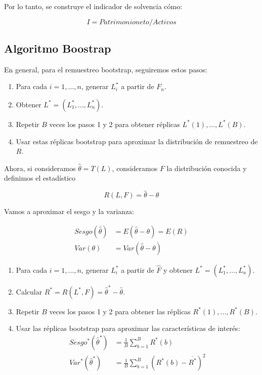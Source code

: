\documentclass[
]{article}
\begin{document}
Por lo tanto, se construye el indicador de solvencia cómo:

\[I=Patrimonio neto/Activos\]

\hypertarget{algoritmo-boostrap}{%
\subsection{Algoritmo Boostrap}\label{algoritmo-boostrap}}

En general, para el remuestreo bootstrap, seguiremos estos pasos:

\begin{enumerate}
    \item Para cada $i=1, \ldots, n$, generar $L^*_i$ a partir de $F_n$.
    \item Obtener $L^* = (L^*_1, \ldots, L^*_n)$.
    \item Repetir $B$ veces los pasos 1 y 2 para obtener réplicas $L^*(1), \ldots, L^*(B)$.
    \item Usar estas réplicas bootstrap para aproximar la distribución de remuestreo de $R$.
\end{enumerate}

Ahora, si consideramos \(\hat{\theta} = T(L)\), consideramos \(F\) la
distribución conocida y definimos el estadístico

\[ R(L, F) = \hat{\theta} - \theta \]

Vamos a aproximar el sesgo y la varianza:

\begin{align*}
    Sesgo(\hat{\theta}) &= E(\hat{\theta} - \theta) = E(R) \\
    Var(\theta) &= Var(\hat{\theta} - \theta)
\end{align*}

\begin{enumerate}
    \item Para cada $i = 1, \ldots, n$, generar $L^*_i$ a partir de $\hat{F}$ y obtener $L^* = (L^*_1, \ldots, L^*_n)$.
    \item Calcular $R^* = R(L^*, F) = \hat{\theta}^* - \hat{\theta}$.
    \item Repetir $B$ veces los pasos 1 y 2 para obtener las réplicas $R^*(1), \ldots, R^*(B)$.
    \item Usar las réplicas bootstrap para aproximar las características de interés:
    \begin{align*}
        Sesgo^*(\hat{\theta}^*) &= \frac{1}{B} \sum_{b=1}^{B} R^*(b) \\
        Var^*(\hat{\theta}^*) &= \frac{1}{B} \sum_{b=1}^{B} (R^*(b) - \overline{R^*})^2
    \end{align*}
\end{enumerate}
\end{document}

